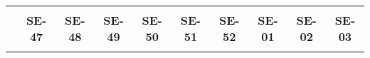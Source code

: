 \begin{tabular}{lccccccccc}
	\textbf{}              & \multicolumn{1}{l}{}                        & \multicolumn{1}{l}{}      & \multicolumn{1}{l}{}                         & \multicolumn{1}{l}{}                         & \multicolumn{1}{l}{}                         & \multicolumn{1}{l}{}                        & \multicolumn{1}{l}{}                         & \multicolumn{1}{l}{}                         & \multicolumn{1}{l}{}     \\
	\textbf{}                                                                               
	 
	&\textbf{SE-47}								&\textbf{SE-48}  				  &\textbf{SE-49}
	&\textbf{SE-50}								&\textbf{SE-51}					  &\textbf{SE-52}
	&\textbf{SE-01}								&\textbf{SE-02}					 &\textbf{SE-03}\\
		\textbf{}              
	 

\end{tabular}
